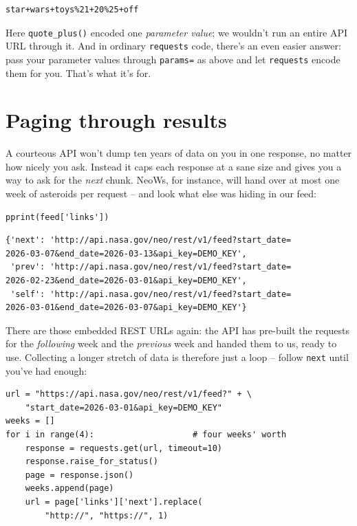 \begin{Verbatim}[fontsize=\small,samepage=true,frame=leftline,framesep=5mm,framerule=1mm]
star+wars+toys%21+20%25+off
\end{Verbatim}

Here \texttt{quote\_plus()} encoded one \textit{parameter value}; we wouldn't
run an entire API URL through it. And in ordinary \texttt{requests} code,
there's an even easier answer: pass your parameter values through
\texttt{params=} as above and let \texttt{requests} encode them for you.
That's what it's for.

\section{Paging through results}

A courteous API won't dump ten years of data on you in one response, no matter
how nicely you ask. Instead it caps each response at a sane size and gives you
a way to ask for the \textit{next} chunk. NeoWs, for instance, will hand over
at most one week of asteroids per request -- and look what else was hiding in
our feed:

\begin{Verbatim}[fontsize=\small,samepage=true,frame=single,framesep=3mm]
pprint(feed['links'])
\end{Verbatim}
\vspace{-.2in}

\begin{Verbatim}[fontsize=\scriptsize,samepage=true,frame=leftline,framesep=5mm,framerule=1mm]
{'next': 'http://api.nasa.gov/neo/rest/v1/feed?start_date=
2026-03-07&end_date=2026-03-13&api_key=DEMO_KEY',
 'prev': 'http://api.nasa.gov/neo/rest/v1/feed?start_date=
2026-02-23&end_date=2026-03-01&api_key=DEMO_KEY',
 'self': 'http://api.nasa.gov/neo/rest/v1/feed?start_date=
2026-03-01&end_date=2026-03-07&api_key=DEMO_KEY'}
\end{Verbatim}

There are those embedded REST URLs again: the API has pre-built the requests
for the \textit{following} week and the \textit{previous} week and handed them
to us, ready to use. Collecting a longer stretch of data is therefore just a
loop -- follow \texttt{next} until you've had enough:

\begin{Verbatim}[fontsize=\small,samepage=true,frame=single,framesep=3mm]
url = "https://api.nasa.gov/neo/rest/v1/feed?" + \
    "start_date=2026-03-01&api_key=DEMO_KEY"
weeks = []
for i in range(4):                    # four weeks' worth
    response = requests.get(url, timeout=10)
    response.raise_for_status()
    page = response.json()
    weeks.append(page)
    url = page['links']['next'].replace(
        "http://", "https://", 1)
\end{Verbatim}


